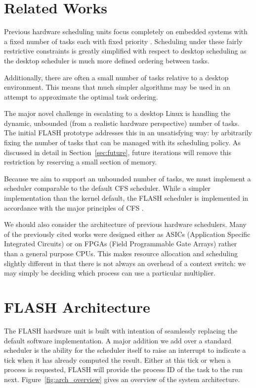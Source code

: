 \documentclass{sig-alternate-10pt}
\begin{document}
\section{Related Works}
\label{sec:related_works}
Previous hardware scheduling units focus completely on embedded systems with
a fixed number of tasks each with fixed priority
\cite{kuacharoen2003configurable, morton2004hardware, nacul2007hardware,
nakano1995hardware, park2008hardware}.  Scheduling under these fairly
restrictive constraints is greatly simplified with respect to desktop
scheduling as the desktop scheduler is much more defined ordering between
tasks.

Additionally, there are often a small number of tasks relative to a desktop
environment.  This means that much simpler algorithms may be used in an
attempt to approximate the optimal task ordering.

The major novel challenge in escalating to a desktop Linux is handling the
dynamic, unbounded (from a realistic hardware perspective) number of tasks.
The initial FLASH prototype addresses this in an unsatisfying way: by
arbitrarily fixing the number of tasks that can be managed with its
scheduling policy.  As discussed in detail in Section~\ref{sec:future},
future iterations will remove this restriction by reserving a small section
of memory.

Because we aim to support an unbounded number of tasks, we must implement
a scheduler comparable to the default CFS scheduler.
While a simpler implementation than the kernel default, the FLASH scheduler
is implemented in accordance with the major principles of CFS
\cite{wong2008cfs}.

We should also consider the architecture of previous hardware schedulers.
Many of the previously cited works were designed either as ASICs
(Application Specific Integrated Circuits) or on FPGAs (Field Programmable
Gate Arrays) rather than a general purpose CPUs.  This makes resource
allocation and scheduling slightly different in that there is not always an
overhead of a context switch: we may simply be deciding which process can
use a particular multiplier.


\section{FLASH Architecture}
\label{sec:arch}
The FLASH hardware unit is built with intention of seamlessly replacing the default software implementation. A major addition we add over a standard
scheduler is the ability for the scheduler itself to raise an
interrupt to indicate a tick when it has already computed the result. Either at this tick or when a process is
requested, FLASH will provide the process ID of the task to the run next.
Figure~\ref{fig:arch_overview} gives an overview of the system architecture.
\end{document}

